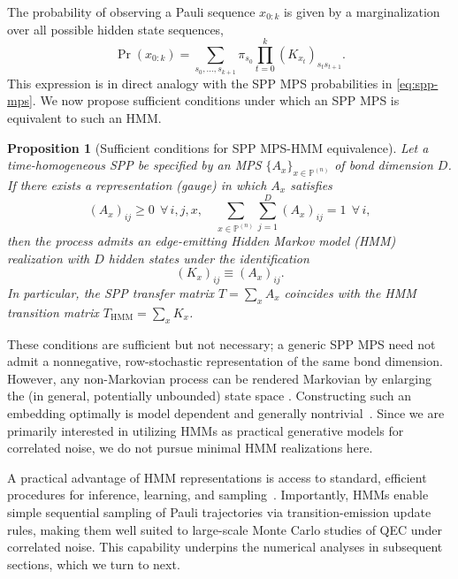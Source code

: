 \documentclass[
    aps,
    prx,
    reprint,
    superscriptaddress,
    longbibliography,
    nofootinbib,
    floatfix,
]{revtex4-2}
\newtheorem{proposition}[theorem]{Proposition}
\begin{document}
The probability of observing a Pauli sequence \(x_{0:k}\) is given by a marginalization over all possible hidden state sequences,
\begin{equation}
    \Pr(x_{0:k}) = \sum_{s_0,\dots,s_{k+1}} \pi_{s_0} \prod_{t=0}^k (K_{x_t})_{s_t s_{t+1}}.
\end{equation}
This expression is in direct analogy with the SPP MPS probabilities in \cref{eq:spp-mps}. We now propose sufficient conditions under which an SPP MPS is equivalent to such an HMM.
\begin{proposition}[Sufficient conditions for SPP MPS-HMM equivalence]
    Let a time-homogeneous SPP be specified by an MPS \(\{A_x\}_{x\in\mathbb P^{(n)}}\) of bond dimension \(D\). If there exists a representation (gauge) in which \(A_x\) satisfies
    \begin{equation}
        (A_x)_{ij}\ge 0 \ \ \forall\, i,j,x, \quad
        \sum_{x\in\mathbb{P}^{(n)}}\sum_{j=1}^{D} (A_x)_{ij}=1 \ \ \forall\, i,
    \end{equation}
    then the process admits an edge-emitting Hidden Markov model (HMM) realization with \(D\) hidden states under the identification
    \begin{equation}
        (K_x)_{ij}\equiv(A_x)_{ij}.
    \end{equation}
    In particular, the SPP transfer matrix \(T = \sum_x A_x\) coincides with the HMM transition matrix \(T_{\mathrm{HMM}} = \sum_x K_x\).
\end{proposition}

These conditions are sufficient but not necessary; a generic SPP MPS need not admit a nonnegative, row-stochastic representation of the same bond dimension. However, any non-Markovian process can be rendered Markovian by enlarging the (in general, potentially unbounded) state space \cite{milzQuantumStochasticProcesses2021}. Constructing such an embedding optimally is model dependent and generally nontrivial~\cite{vidyasagarCompleteRealizationProblem2011}. Since we are primarily interested in utilizing HMMs as practical generative models for correlated noise, we do not pursue minimal HMM realizations here.

A practical advantage of HMM representations is access to standard, efficient procedures for inference, learning, and sampling~\cite{leonarde.baumMaximizationTechniqueOccurring1970}. Importantly, HMMs enable simple sequential sampling of Pauli trajectories via transition-emission update rules, making them well suited to large-scale Monte Carlo studies of QEC under correlated noise. This capability underpins the numerical analyses in subsequent sections, which we turn to next.
\end{document}
